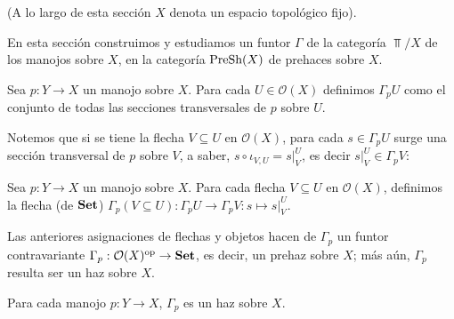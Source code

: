(A lo largo de esta sección $X$ denota un espacio topológico fijo).

En esta sección construimos y estudiamos un funtor $\Gamma$ de la categoría $\Top /X$ de los manojos sobre $X$, en la categoría $\normalfont{\text{PreSh}} (X)$ de prehaces sobre $X$.

\begin{Def}
   Sea $p:Y\to X$ un manojo sobre $X$. Para cada $U\in\mathcal{O}(X)$ definimos $\Gamma_p U$ como el conjunto de todas las secciones transversales de $p$ sobre $U$.
   
\end{Def}
Notemos que si se tiene la flecha $V\subseteq U$ en $\mathcal{O}(X)$, para cada $s\in\Gamma_p U$ surge una sección transversal de $p$ sobre $V$, a saber, $s\circ \iota_{V,U}=s|^{U}_{V}$, es decir $s|^{U}_{V}\in\Gamma_p V$:

\begin{Def}
   Sea $p:Y\to X$ un manojo sobre $X$. Para cada flecha $V\subseteq U$ en $\mathcal{O}(X)$, definimos la flecha (de $\normalfont{\textbf{Set}}$) $\Gamma_p(V\subseteq U):\Gamma_p U\to \Gamma_p V:s\mapsto s|^{U}_{V}$. 
\end{Def}
Las anteriores asignaciones de flechas y objetos hacen de $\Gamma_p$ un funtor contravariante $\Gamma_p:\mathcal{O}(X)^{\text{op}}\to \normalfont{\textbf{Set}}$, es decir, un prehaz sobre $X$; más aún, $\Gamma_p$ resulta ser un haz sobre $X$.
\begin{Prop}
   Para cada manojo $p:Y\to X$, $\Gamma_p$ es un haz sobre $X$.
\end{Prop}
